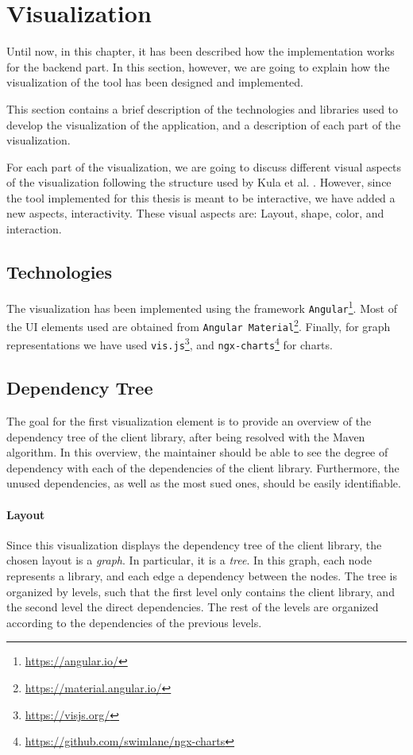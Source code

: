 \section{Visualization}
Until now, in this chapter, it has been described how the implementation works for the backend part. In this section, however, we are going to explain how the visualization of the tool has been designed and implemented.

This section contains a brief description of the technologies and libraries used to develop the visualization of the application, and a description of each part of the visualization.

For each part of the visualization, we are going to discuss different visual aspects of the visualization following the structure used by Kula et al. \cite{kula2014visualizing}. However, since the tool implemented for this thesis is meant to be interactive, we have added a new aspects, interactivity. These visual aspects are: Layout, shape, color, and interaction.

\subsection{Technologies}
The visualization has been implemented using the framework \texttt{Angular}\footnote{\url{https://angular.io/}}. Most of the UI elements used are obtained from \texttt{Angular Material}\footnote{\url{https://material.angular.io/}}. Finally, for graph representations we have used \texttt{vis.js}\footnote{\url{https://visjs.org/}}, and \texttt{ngx-charts}\footnote{\url{https://github.com/swimlane/ngx-charts}} for charts.

\subsection{Dependency Tree}\label{sec:visualization-dependency-tree}
The goal for the first visualization element is to provide an overview of the dependency tree of the client library, after being resolved with the Maven algorithm. In this overview, the maintainer should be able to see the degree of dependency with each of the dependencies of the client library. Furthermore, the unused dependencies, as well as the most sued ones, should be easily identifiable.

\paragraph{Layout}
Since this visualization displays the dependency tree of the client library, the chosen layout is a \textit{graph}. In particular, it is a \textit{tree}. In this graph, each node represents a library, and each edge a dependency between the nodes. The tree is organized by levels, such that the first level only contains the client library, and the second level the direct dependencies. The rest of the levels are organized according to the dependencies of the previous levels.

